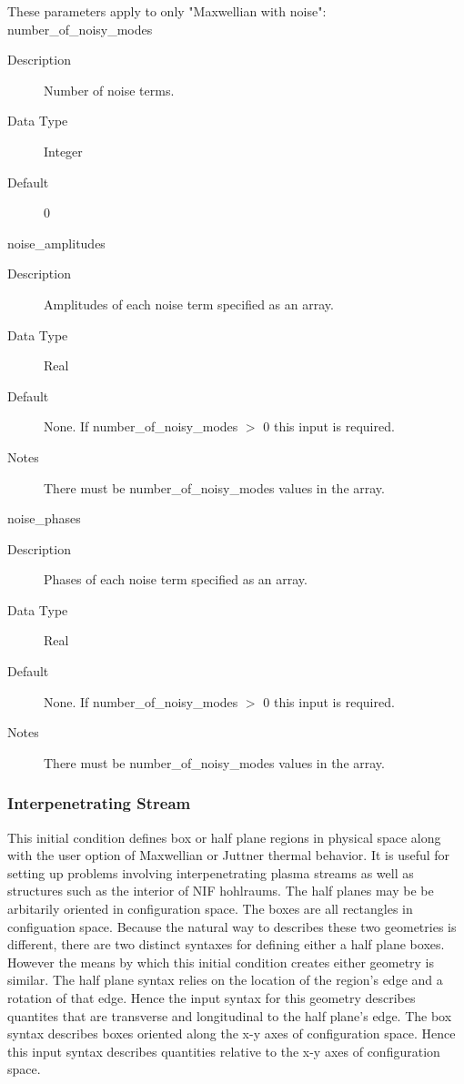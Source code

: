 \documentclass[11pt]{amsart}
\begin{document}
These parameters apply to only "Maxwellian with noise": \\
\indent number\_of\_noisy\_modes
\begin{description}
\item [Description] Number of noise terms.
\item [Data Type] Integer
\item [Default] 0
\end{description}

noise\_amplitudes
\begin{description}
\item [Description] Amplitudes of each noise term specified as an array.
\item [Data Type] Real
\item [Default] None.  If number\_of\_noisy\_modes $>$ 0 this input is
required.
\item [Notes] There must be number\_of\_noisy\_modes values in the array.
\end{description}

noise\_phases
\begin{description}
\item [Description] Phases of each noise term specified as an array.
\item [Data Type] Real
\item [Default] None.  If number\_of\_noisy\_modes $>$ 0 this input is
required.
\item [Notes] There must be number\_of\_noisy\_modes values in the array.
\end{description}

\subsubsection*{Interpenetrating Stream}
This initial condition defines box or half plane regions in physical space along
with the user option of Maxwellian or Juttner thermal behavior.  It is useful
for setting up problems involving interpenetrating plasma streams as well as
structures such as the interior of NIF hohlraums.  The half planes may be be
arbitarily oriented in configuration space.  The boxes are all rectangles in
configuation space.  Because the natural way to describes these two geometries
is different, there are two distinct syntaxes for defining either a half plane
boxes.  However the means by which this initial condition creates either
geometry is similar.  The half plane syntax relies on the location of the
region's edge and a rotation of that edge.  Hence the input syntax for this
geometry describes quantites that are transverse and longitudinal to the half
plane's edge.  The box syntax describes boxes oriented along the x-y axes of
configuration space.  Hence this input syntax describes quantities relative to
the x-y axes of configuration space.
\end{document}
